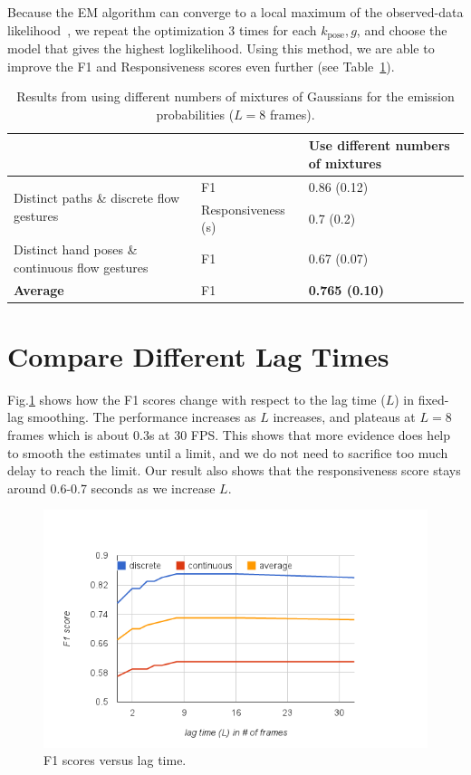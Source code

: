 Because the EM algorithm can converge to a local maximum of the observed-data
likelihood~\cite{dicintio12}, we repeat the optimization 3 times for each
$k_\text{pose},g$, and choose the model that gives the highest loglikelihood.
Using this method, we are able to improve the F1 and Responsiveness scores even further (see Table~\ref{tab:different-mixtures}).

\begin{table}[t]
\centering
\begin{tabular}{|p{4.5cm}|l|p{3cm}|}
\hline
& & Use different numbers of mixtures \\
\hline
\multirow{2}{4cm}{Distinct paths \& discrete flow gestures} 
& F1 & 0.86 (0.12) \\
\cline{2-3}
& Responsiveness (s) & 0.7 (0.2)  \\
\hline
Distinct hand poses \& continuous flow gestures
& F1 & 0.67 (0.07)  \\
\hline
\textbf{Average} & F1 & \textbf{0.765 (0.10)}\\
\hline
\end{tabular}
\caption{Results from using different numbers of mixtures of Gaussians
for the emission probabilities ($L = 8$ frames).}
\label{tab:different-mixtures}
\end{table}


\section{Compare Different Lag Times}
Fig.\ref{fig:lag} shows how the F1 scores change with respect to the lag time
($L$) in fixed-lag smoothing. The performance increases as $L$ increases, and
plateaus at $L=8$ frames which is about 0.3s at 30 FPS. This shows that more
evidence does help to smooth the estimates until a limit, and we do not need to
sacrifice too much delay to reach the limit. Our result also shows that the
responsiveness score stays around 0.6-0.7 seconds as we increase $L$.

\begin{figure}[t]
\centering
\includegraphics[trim=0 5mm 0 15mm, clip,
width=\columnwidth]{figures/f1_lag.png}
\caption{F1 scores versus lag time.}
\label{fig:lag}
\end{figure}

